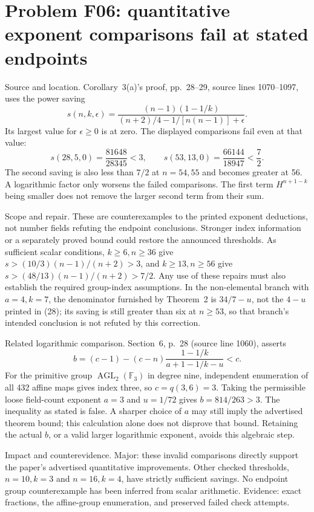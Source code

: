 \documentclass[10pt]{article}
\begin{document}
\section*{Problem F06: quantitative exponent comparisons fail at stated endpoints}
Source and location. Corollary 3(a)’s proof, pp. 28–29, source lines 1070–1097, uses the power saving \[s(n,k,\epsilon)=\frac{(n-1)(1-1/k)}
 {(n+2)/4-1/[n(n-1)]+\epsilon}.\] Its largest value for \(\epsilon\ge0\) is at zero. The displayed comparisons fail even at that value: \[s(28,5,0)=\frac{81648}{28345}<3,\qquad
 s(53,13,0)=\frac{66144}{18947}<\frac72.\] The second saving is also less than \(7/2\) at \(n=54,55\) and becomes greater at 56. A logarithmic factor only worsens the failed comparisons. The first term \(H^{n+1-k}\) being smaller does not remove the larger second term from their sum.\par
Scope and repair. These are counterexamples to the printed exponent deductions, not number fields refuting the endpoint conclusions. Stronger index information or a separately proved bound could restore the announced thresholds. As sufficient scalar conditions, \(k\ge6,n\ge36\) give \(s> (10/3)(n-1)/(n+2)>3\), and \(k\ge13,n\ge56\) give \(s>(48/13)(n-1)/(n+2)>7/2\). Any use of these repairs must also establish the required group-index assumptions. In the non-elemental branch with \(a=4,k=7\), the denominator furnished by Theorem 2 is \(34/7-u\), not the \(4-u\) printed in (28); its saving is still greater than six at \(n\ge53\), so that branch’s intended conclusion is not refuted by this correction.\par
Related logarithmic comparison. Section 6, p. 28 (source line 1060), asserts \[b=(c-1)-(c-n)\frac{1-1/k}{a+1-1/k-u}<c.\] For the primitive group \(\operatorname{AGL}_2(\mathbb F_3)\) in degree nine, independent enumeration of all 432 affine maps gives index three, so \(c=q(3,6)=3\). Taking the permissible loose field-count exponent \(a=3\) and \(u=1/72\) gives \(b=814/263>3\). The inequality as stated is false. A sharper choice of \(a\) may still imply the advertised theorem bound; this calculation alone does not disprove that bound. Retaining the actual \(b\), or a valid larger logarithmic exponent, avoids this algebraic step.\par
Impact and counterevidence. Major: these invalid comparisons directly support the paper’s advertised quantitative improvements. Other checked thresholds, \(n=10,k=3\) and \(n=16,k=4\), have strictly sufficient savings. No endpoint group counterexample has been inferred from scalar arithmetic. Evidence: exact fractions, the affine-group enumeration, and preserved failed check attempts.\par
\end{document}
